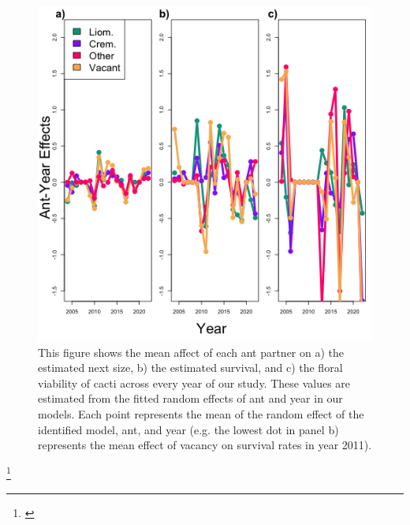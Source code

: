 \documentclass[11pt]{article}
\newcommand{\ali}[2]{{\color{blue}{#1}}\footnote{\textit{\color{blue}{#2}}}}
\begin{document}
\begin{figure}[H]
	\includegraphics[width=0.95\linewidth]{Figures/year_ant_timeseries.png}
	\caption{This figure shows the mean affect of each ant partner on a) the estimated next size, b) the estimated survival, and c) the floral viability of cacti across every year of our study. These values are estimated from the fitted random effects of ant and year in our models. Each point represents the mean of the random effect of the identified model, ant, and year (e.g. the lowest dot in panel b) represents the mean effect of vacancy on survival rates in year 2011).}
	\label{fig:Annual_Ant}
\end{figure}
\ali{}{Honestly not sure if I should include an image for this one or just report some values? We should discuss. }
\end{document}
